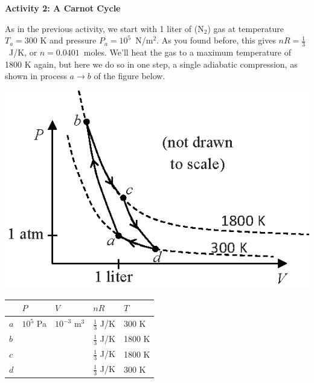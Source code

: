 \vspace{0.3in}

\pagebreak
\textbf{Activity 2: A Carnot Cycle}

As in the previous activity, we start with 1 liter of ($\textrm{N}_2$) gas at temperature $T_a = 300$ K and pressure $P_a=10^5$~N/m$^2$.   As you found before, this gives $nR=\frac{1}{3}$~J/K, or $n=0.0401$~moles.  We'll heat the gas to a maximum temperature of 1800 K again, but here we do so in one step, a single adiabatic compression, as shown in process $a \rightarrow b$ of the figure below.

\begin{minipage}{0.44\textwidth}
\includegraphics[width=1.0\textwidth]{ideal_gas_cycles/carnot_cycle.eps}
\end{minipage}
\begin{minipage}{0.54\textwidth}
\vspace{0.1 in}
\renewcommand{\arraystretch}{2.0}
\begin{tabular}{| C{0.3in} | C{0.6in} | C{0.6in} | C{0.6in} | C{0.6in} |}
\hline
& $P$ & $V$ & $nR$ & $T$ \\ \hline
$a$ & $10^5$ Pa & $10^{-3}$ m$^3$ & $\frac{1}{3}$ J/K & 300 K \\ \hline
$b$ &                  &                            & $\frac{1}{3}$ J/K & 1800 K \\ \hline
$c$ &                  &                            & $\frac{1}{3}$ J/K & 1800 K \\ \hline
$d$ &                  &                            & $\frac{1}{3}$ J/K & 300 K \\ \hline
\end{tabular}
\renewcommand{\arraystretch}{1.0}
\end{minipage}

